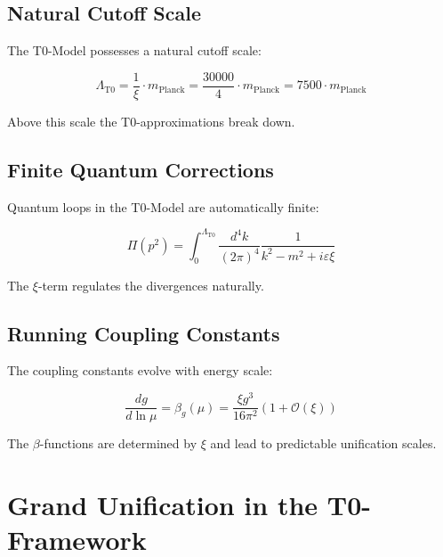 \documentclass[12pt,a4paper]{report}
\newcommand{\xipar}{\xi}      %
\begin{document}
	\subsection{Natural Cutoff Scale}\label{subsec:natural_cutoff}
	
	The T0-Model possesses a natural cutoff scale:
	
	\begin{equation}\label{eq:cutoff_scale}
		\Lambda_{\text{T0}} = \frac{1}{\xipar} \cdot m_{\text{Planck}} = \frac{30000}{4} \cdot m_{\text{Planck}} = 7500 \cdot m_{\text{Planck}}
	\end{equation}
	
	Above this scale the T0-approximations break down.
	
	\subsection{Finite Quantum Corrections}\label{subsec:finite_quantum_corrections}
	
	Quantum loops in the T0-Model are automatically finite:
	
	\begin{equation}\label{eq:finite_loop}
		\Pi(p^2) = \int_0^{\Lambda_{\text{T0}}} \frac{d^4k}{(2\pi)^4} \frac{1}{k^2 - m^2 + i\varepsilon \xipar}
	\end{equation}
	
	The $\xipar$-term regulates the divergences naturally.
	
	\subsection{Running Coupling Constants}\label{subsec:running_couplings}
	
	The coupling constants evolve with energy scale:
	
	\begin{equation}\label{eq:running_couplings}
		\frac{dg}{d\ln\mu} = \beta_g(\mu) = \frac{\xipar g^3}{16\pi^2} \left(1 + \mathcal{O}(\xipar)\right)
	\end{equation}
	
	The $\beta$-functions are determined by $\xipar$ and lead to predictable unification scales.
	
	\section{Grand Unification in the T0-Framework}\label{sec:grand_unification}
	
\end{document}
